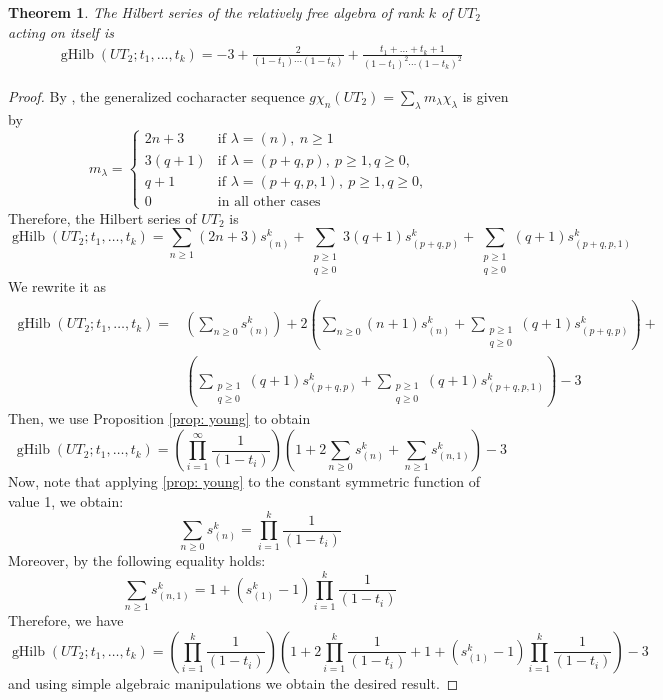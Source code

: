 \documentclass{article}
\newtheorem{theorem}{Theorem}[section]
\DeclareMathOperator{\Hilb}{gHilb}
\begin{document}
\begin{theorem}
	The Hilbert series of the relatively free algebra of rank $k$ of $UT_2$ acting on itself is \begin{gather*}
		\Hilb(UT_2; t_1,\dots,t_k) = -3 +\frac{2}{(1-t_1)\cdots (1-t_k)} + \frac{t_1+\ldots +t_k +1}{(1-t_1)^2\cdots (1-t_k)^2}
	\end{gather*}
\end{theorem}
\begin{proof}
	By \cite[Theorem 4.4]{MR25a}, the generalized cocharacter sequence $g\chi_n(UT_2)=\sum_\lambda m_\lambda \chi_\lambda$ is given by
	\[ m_\lambda = \begin{cases}
		2n+3 &\text{if } \lambda = (n),\ n\geq 1 \\
		3(q+1) &\text{if } \lambda = (p+q,p),\ p\geq1, q\geq 0, \\
		q+1 &\text{if } \lambda = (p+q,p,1),\ p\geq1, q\geq 0, \\
		0 &\text{in all other cases}
	\end{cases} \]
	Therefore, the Hilbert series of $UT_2$ is 
	\[ \Hilb(UT_2; t_1,\dots,t_k) = \sum_{n\geq 1} (2n+3) s^k_{(n)} + \sum_{\substack{p\geq 1 \\ q\geq 0}} 3(q+1) s^k_{(p+q,p)} + \sum_{\substack{p\geq 1 \\ q\geq 0}} (q+1) s^k_{(p+q,p,1)}  \]
	We rewrite it as \begin{align*}
		\Hilb(UT_2; t_1,\dots,t_k) = &\left( \sum_{n\geq 0} s^k_{(n)} \right) +  2 \left( \sum_{n\geq 0} (n+1) s^k_{(n)} + \sum_{\substack{p\geq 1 \\ q\geq 0}} (q+1) s^k_{(p+q,p)} \right) + \\
		&\left( \sum_{\substack{p\geq 1 \\ q\geq 0}} (q+1) s^k_{(p+q,p)} + \sum_{\substack{p\geq 1 \\ q\geq 0}} (q+1) s^k_{(p+q,p,1)} \right) - 3
	\end{align*}
	Then, we use Proposition \ref{prop: young} to obtain
	\[ \Hilb(UT_2; t_1,\dots,t_k) = \left(\prod_{i=1}^{\infty}\frac{1}{(1-t_i)}\right) \left( 1 + 2\sum_{n\geq 0} s^k_{(n)} + \sum_{n\geq 1} s^k_{(n,1)} \right) -3  \]
	Now, note that applying \ref{prop: young} to the constant symmetric function of value 1, we obtain:
	\[\sum_{n\geq 0} s^k_{(n)} = \prod_{i=1}^{k}\frac{1}{(1-t_i)}\]
	Moreover, by \cite[Lemma 7]{BD12} the following equality holds:
	\[ \sum_{n\geq 1} s^k_{(n,1)} = 1 + (s^k_{(1)}-1)\prod_{i=1}^{k}\frac{1}{(1-t_i)} \]
	Therefore, we have
	\[ \Hilb(UT_2; t_1,\dots,t_k) = \left(\prod_{i=1}^{k}\frac{1}{(1-t_i)}\right) \left( 1 + 2\prod_{i=1}^{k}\frac{1}{(1-t_i)} + 1 + (s^k_{(1)}-1)\prod_{i=1}^{k}\frac{1}{(1-t_i)} \right) -3\]
	and using simple algebraic manipulations we obtain the desired result.
\end{proof}
\end{document}
